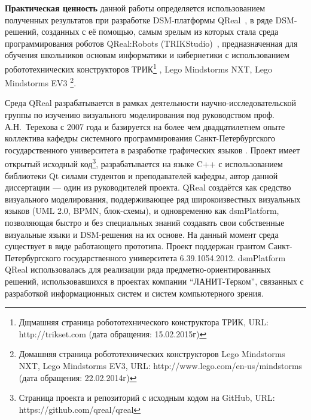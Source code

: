 \textbf{Практическая ценность} данной работы определяется использованием полученных 
результатов при разработке \ac{DSM}-платформы QReal~\cite{terekhov2009architecture, kuzenkova2011qreal}, 
в ряде \ac{DSM}-решений, созданных с её помощью, самым зрелым из которых стала среда программирования 
роботов QReal:Robots (TRIKStudio)~\cite{bryksin2011robots}, предназначенная для обучения 
школьников основам информатики и кибернетики с использованием робототехнических 
конструкторов ТРИК\footnote{Дщмашняя страница робототехнического конструктора ТРИК, URL: http://trikset.com (дата обращения: 15.02.2015г)}%
, Lego Mindstorms NXT, Lego Mindstorms EV3%
\footnote{Домашняя страница робототехнических конструкторов Lego Mindstorms NXT, Lego Mindstorms EV3,
URL: http://www.lego.com/en-us/mindstorms (дата обращения: 22.02.2014г)}.

Среда QReal разрабатывается в рамках деятельности научно-исследовательской 
группы по изучению визуального моделирования под руководством проф. 
А.Н.~Терехова с 2007 года и базируется на более чем двадцатилетнем опыте 
коллектива кафедры системного программирования Санкт-Петербургского 
государственного университета в разработке графических языков 
\cite{ivanov2005realit, parfenov1997rtst, terekhov1998rtst, ivanov1998object, ivanov1998behavioral}. 
Проект имеет открытый исходный 
код\footnote{Страница проекта и репозиторий с исходным кодом на GitHub, URL: https://github.com/qreal/qreal}, 
разрабатывается на языке C++ с использованием библиотеки Qt силами студентов и преподавателей кафедры, автор 
данной диссертации --- один из руководителей проекта. QReal создаётся как 
средство визуального моделирования, поддерживающее ряд широкоизвестных 
визуальных языков (\ac{UML} 2.0, \ac{BPMN}, блок-схемы), и одновременно как \ac{dsmPlatform}, 
позволяющая быстро и без специальных знаний создавать свои собственные 
визуальные языки и \ac{DSM}-решения на их основе. На данный момент среда существует 
в виде работающего прототипа. Проект поддержан грантом Санкт-Петербургского 
государственного университета 6.39.1054.2012. \ac{dsmPlatform} QReal использовалась
 для реализации ряда предметно-ориентированных решений, использовавшихся в 
проектах компании "`ЛАНИТ-Терком"', связанных с разработкой информационных систем 
и систем компьютерного зрения.

